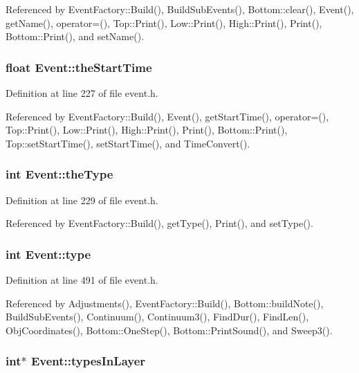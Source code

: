Referenced by Event\-Factory::Build(), Build\-Sub\-Events(), Bottom::clear(), Event(), get\-Name(), operator=(), Top::Print(), Low::Print(), High::Print(), Print(), Bottom::Print(), and set\-Name().
\subsubsection{\setlength{\rightskip}{0pt plus 5cm}float {\bf Event::the\-Start\-Time}}\label{classEvent_o5}




Definition at line 227 of file event.h.

Referenced by Event\-Factory::Build(), Event(), get\-Start\-Time(), operator=(), Top::Print(), Low::Print(), High::Print(), Print(), Bottom::Print(), Top::set\-Start\-Time(), set\-Start\-Time(), and Time\-Convert().
\subsubsection{\setlength{\rightskip}{0pt plus 5cm}int {\bf Event::the\-Type}}\label{classEvent_o7}




Definition at line 229 of file event.h.

Referenced by Event\-Factory::Build(), get\-Type(), Print(), and set\-Type().
\subsubsection{\setlength{\rightskip}{0pt plus 5cm}int {\bf Event::type}}\label{classEvent_o45}




Definition at line 491 of file event.h.

Referenced by Adjustments(), Event\-Factory::Build(), Bottom::build\-Note(), Build\-Sub\-Events(), Continuum(), Continuum3(), Find\-Dur(), Find\-Len(), Obj\-Coordinates(), Bottom::One\-Step(), Bottom::Print\-Sound(), and Sweep3().
\subsubsection{\setlength{\rightskip}{0pt plus 5cm}int$\ast$ {\bf Event::types\-In\-Layer}}\label{classEvent_o23}




